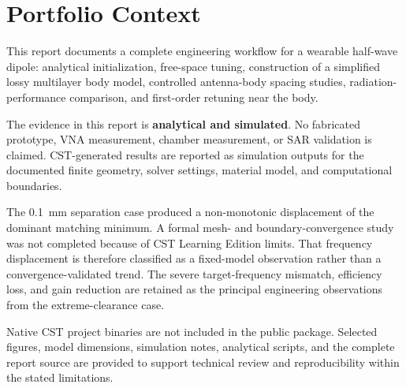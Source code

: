 \chapter*{Portfolio Context}

This report documents a complete engineering workflow for a wearable half-wave dipole: analytical initialization, free-space tuning, construction of a simplified lossy multilayer body model, controlled antenna-body spacing studies, radiation-performance comparison, and first-order retuning near the body.

The evidence in this report is \textbf{analytical and simulated}. No fabricated prototype, VNA measurement, chamber measurement, or SAR validation is claimed. CST-generated results are reported as simulation outputs for the documented finite geometry, solver settings, material model, and computational boundaries.

The 0.1~mm separation case produced a non-monotonic displacement of the dominant matching minimum. A formal mesh- and boundary-convergence study was not completed because of CST Learning Edition limits. That frequency displacement is therefore classified as a fixed-model observation rather than a convergence-validated trend. The severe target-frequency mismatch, efficiency loss, and gain reduction are retained as the principal engineering observations from the extreme-clearance case.

Native CST project binaries are not included in the public package. Selected figures, model dimensions, simulation notes, analytical scripts, and the complete report source are provided to support technical review and reproducibility within the stated limitations.
